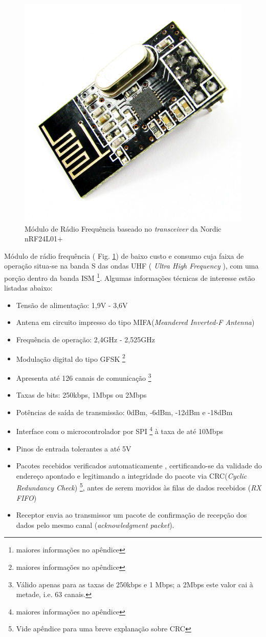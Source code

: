   \begin{figure}[!htb] %
    \centering
    \includegraphics[width=0.5\linewidth]{../../Imagens/nordicc.png}
    \caption{Módulo de Rádio Frequência baseado no \textit{transceiver} da Nordic nRF24L01+}
    \label{Nordic}
  \end{figure}
Módulo de rádio frequência ( Fig. \ref{Nordic}) de baixo custo e consumo cuja faixa de operação situa-se na banda S das ondas UHF ( \textit{Ultra 
High Frequency} ), com uma porção dentro da banda ISM \footnote{maiores informações no apêndice}.
Algumas informações técnicas \cite{nRF} de interesse estão listadas abaixo: 
\begin{itemize}
 \item Tensão de alimentação: 1,9V - 3,6V
 \item Antena em circuito impresso do tipo MIFA(\textit{Meandered Inverted-F Antenna}) \cite{MIFA}
 \item Frequência de operação: 2,4GHz - 2,525GHz
 \item Modulação digital do tipo GFSK \footnote{maiores informações no apêndice}
 \item Apresenta até 126 canais de comunicação \footnote{Válido apenas para as taxas de 250kbps e 1 Mbps; a 2Mbps este valor cai à metade, i.e. 63 
canais.}
 \item Taxas de bits: 250kbps, 1Mbps ou 2Mbps
 \item Potências de saída de transmissão: 0dBm, -6dBm, -12dBm e -18dBm
 \item Interface com o microcontrolador por SPI \footnote{maiores informações no apêndice} à taxa de até 10Mbps
 \item Pinos de entrada tolerantes a até 5V
 \item 
Pacotes recebidos verificados automaticamente , certificando-se da validade do endereço apontado e legitimando a integridade 
do pacote via CRC(\textit{Cyclic Redundancy Check}) \footnote{Vide apêndice para uma breve explanação sobre CRC}, antes de 
serem movidos às filas de dados recebidos (\textit{RX FIFO})
 \item Receptor envia ao transmissor um pacote de confirmação de recepção dos dados pelo mesmo canal (\textit{acknowledgment packet}).
\end{itemize}

